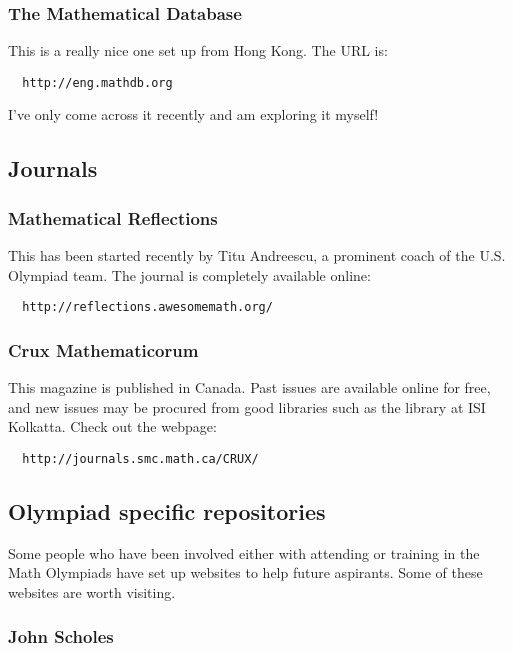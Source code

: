 \documentclass[a4paper]{amsart}
\begin{document}
\subsubsection{The Mathematical Database}

This is a really nice one set up from Hong Kong. The URL is:

\begin{verbatim}
  http://eng.mathdb.org
\end{verbatim}

I've only come across it recently and am exploring it myself!

\subsection{Journals}

\subsubsection{Mathematical Reflections}

This has been started recently by Titu Andreescu, a prominent coach of the U.S. Olympiad team.
The journal is completely available online:

\begin{verbatim}
  http://reflections.awesomemath.org/
\end{verbatim}

\subsubsection{Crux Mathematicorum}

This magazine is published in Canada. Past issues are available online for free,
and new issues may be procured from good libraries such as the library at ISI Kolkatta.
Check out the webpage:

\begin{verbatim}
  http://journals.smc.math.ca/CRUX/
\end{verbatim}

\subsection{Olympiad specific repositories}

Some people who have been involved either with attending or training in the Math Olympiads have set up websites
to help future aspirants. Some of these websites  are worth visiting.
\subsubsection{John Scholes}
\end{document}
